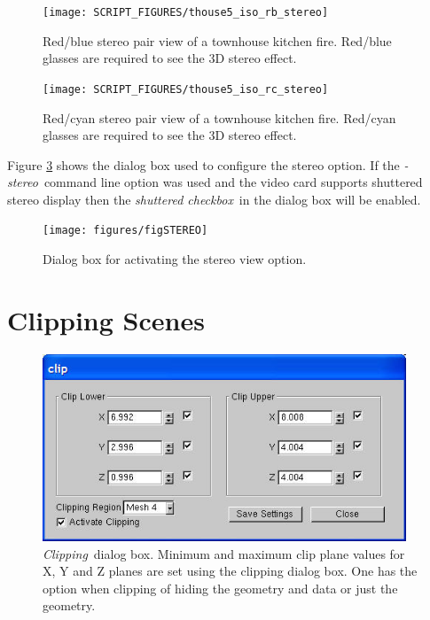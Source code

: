 \documentclass[11pt,twoside]{book}
\newcommand{\figoptions}{hbp}
\begin{document}
\begin{figure}[\figoptions]
\begin{center}
\texttt{[image: SCRIPT\_FIGURES/thouse5\_iso\_rb\_stereo]}\\
\caption[Red/blue stereo pair view of a townhouse kitchen fire.]{
Red/blue stereo pair view of a townhouse kitchen fire. Red/blue glasses are required to see the 3D stereo
effect.
}
\label{figrbstereo}
\end{center}
\end{figure}

\begin{figure}[\figoptions]
\begin{center}
\texttt{[image: SCRIPT\_FIGURES/thouse5\_iso\_rc\_stereo]}\\
\caption[Red/cyan stereo pair view of a townhouse kitchen fire.]{
Red/cyan stereo pair view of a townhouse kitchen fire. Red/cyan glasses are required to see the 3D stereo
effect.
}
\label{figrcstereo}
\end{center}
\end{figure}

Figure \ref{figstereodialog} shows the dialog
box used to configure the stereo option.  If the {\em -stereo}\ command line option was used and
the video card supports shuttered stereo display then the {\em shuttered checkbox}\ in the dialog box will be enabled.

\begin{figure}[\figoptions]
\begin{center}
\texttt{[image: figures/figSTEREO]}
\caption{Dialog
box for activating the stereo view option.}
\label{figstereodialog}
\end{center}
\end{figure}
\section{Clipping Scenes}


\begin{figure}[\figoptions]
\begin{center}
\includegraphics[width=4.2708333in]{figures/figCLIP}
\end{center}
\caption[{\em Clipping}\ dialog box.]{{\em Clipping}\ dialog box.
Minimum and maximum clip plane values for X, Y and Z planes are set
using the clipping dialog box.  One has the option when clipping of
hiding the geometry and data
or just the geometry.
}
\label{figCLIP}
\end{figure}
\end{document}
